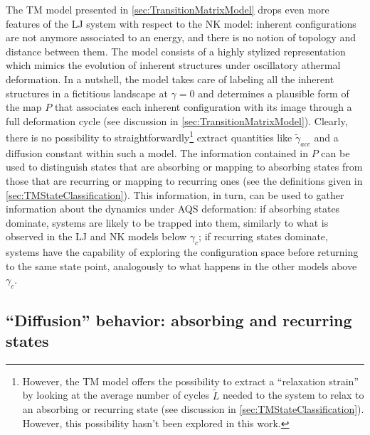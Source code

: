 The TM model presented in \autoref{sec:TransitionMatrixModel} drops even more features of the LJ system with respect to the NK model: inherent configurations are not anymore associated to an energy, and there is no notion of topology and distance between them. The model consists of a highly stylized representation which mimics the evolution of inherent structures under oscillatory athermal deformation. In a nutshell, the model takes care of labeling all the inherent structures in a fictitious landscape at $\gamma = 0$ and determines a plausible form of the map $P$ that associates each inherent configuration with its image through a full deformation cycle (see discussion in \autoref{sec:TransitionMatrixModel}). Clearly, there is no possibility to straightforwardly\footnote{However, the TM model offers the possibility to extract a ``relaxation strain'' by looking at the average number of cycles $\widetilde{L}$ needed to the system to relax to an absorbing or recurring state (see discussion in \autoref{sec:TMStateClassification}). However, this possibility hasn't been explored in this work.} extract quantities like $\widetilde{\gamma}_{acc}$ and a diffusion constant within such a model.
The information contained in $P$ can be used to distinguish states that are absorbing or mapping to absorbing states from those that are recurring or mapping to recurring ones (see the definitions given in \autoref{sec:TMStateClassification}). This information, in turn, can be used to gather information about the dynamics under AQS deformation: if absorbing states dominate, systems are likely to be trapped into them, similarly to what is observed in the LJ and NK models below $\gamma_{c}$; if recurring states dominate, systems have the capability of exploring the configuration space before returning to the same state point, analogously to what happens in the other models above $\gamma_{c}$.

\subsection{``Diffusion'' behavior: absorbing and recurring states}

